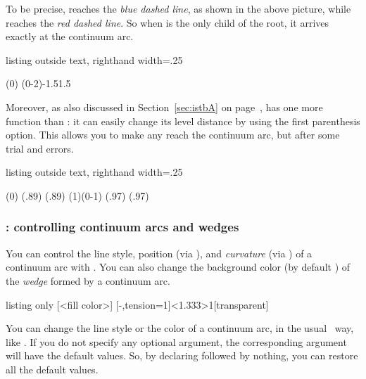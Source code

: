 To be precise, \cmd{\istbA} reaches the \emph{blue dashed line}, as shown in the above picture, while \cmd{\istb} reaches the \emph{red dashed line}.
So when \cmd{\istbA} is the only child of the root, it arrives exactly at the continuum arc.

\begin{tcblisting}{listing outside text, righthand width=.25\linewidth}
\begin{istgame}[scale=1.2]
\istrootcntmA(0)
  \istbA*
  \istbA* 
  \istbA*  
  \endist
{}(0-2){-1.5}{1.5}
\end{istgame}
\end{tcblisting}


Moreover, as also discussed in Section~\ref{sec:istbA} on page~\pageref{sec:istbA}, \cmd{\istbA} has one more function than \cmd{\istb}: it can easily change its level distance by using the first parenthesis option.
This allows you to make any \cmd{\istbA} reach the continuum arc, but after some trial and errors.

\begin{tcblisting}{listing outside text, righthand width=.25\linewidth}
\begin{istgame}[scale=1.2]
\istrootcntmA(0)
  \istbA*(.89)  \istbA*     \istbA*(.89)
  \endist
\istrootcntmA(1)(0-1)
  \istbA*(.97) \istbA*(.97) \endist
\end{istgame}
\end{tcblisting}


\subsubsection{\protect\cmd{\cntmApreset}: controlling continuum arcs and wedges}

You can control the line style, position (via ), and \emph{curvature} (via ) of a continuum arc with \icmd{\cntmApreset}.
You can also change the background color (by default ) of the \emph{wedge} formed by a continuum arc.

\begin{tcblisting}{listing only}
  [<fill color>]
  [-,tension=1]<1.333>{1}[transparent]
\end{tcblisting}

You can change the line style or the color of a continuum arc, in the usual \TikZ\ way, like .
If you do not specify any optional argument, the corresponding argument will have the default values.
So, by declaring \cmd{\cntmApreset} followed by nothing, you can restore all the default values.

